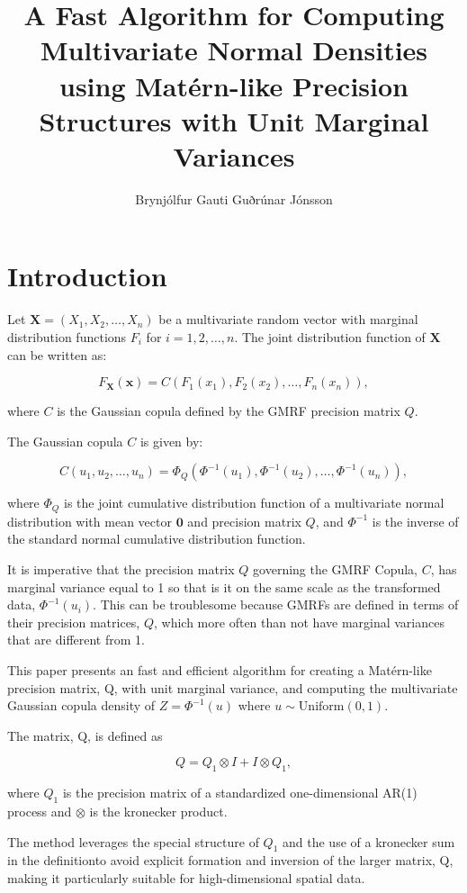 \documentclass[journal=,manuscript=]{achemso}
\author{Brynjólfur Gauti Guðrúnar Jónsson}
\affiliation{ University of Iceland,  }
\title[]{A Fast Algorithm for Computing Multivariate Normal Densities
using Matérn-like Precision Structures with Unit Marginal Variances}
\begin{document}
\maketitle


\section{Introduction}\label{introduction}

Let \(\mathbf{X} = (X_1, X_2, \ldots, X_n)\) be a multivariate random
vector with marginal distribution functions \(F_i\) for
\(i = 1, 2, \ldots, n\). The joint distribution function of
\(\mathbf{X}\) can be written as:

\[
F_{\mathbf{X}}(\mathbf{x}) = C(F_1(x_1), F_2(x_2), \ldots, F_n(x_n)),
\]

where \(C\) is the Gaussian copula defined by the GMRF precision matrix
\(Q\).

The Gaussian copula \(C\) is given by:

\[
C(u_1, u_2, \ldots, u_n) = \Phi_Q(\Phi^{-1}(u_1), \Phi^{-1}(u_2), \ldots, \Phi^{-1}(u_n)),
\]

where \(\Phi_Q\) is the joint cumulative distribution function of a
multivariate normal distribution with mean vector \(\mathbf{0}\) and
precision matrix \(Q\), and \(\Phi^{-1}\) is the inverse of the standard
normal cumulative distribution function.

It is imperative that the precision matrix \(Q\) governing the GMRF
Copula, \(C\), has marginal variance equal to 1 so that is it on the
same scale as the transformed data, \(\Phi^{-1}(u_i)\). This can be
troublesome because GMRFs are defined in terms of their precision
matrices, \(Q\), which more often than not have marginal variances that
are different from 1.

This paper presents an fast and efficient algorithm for creating a
Matérn-like precision matrix, Q, with unit marginal variance, and
computing the multivariate Gaussian copula density of
\(Z = \Phi^{-1}(u)\) where \(u \sim \mathrm{Uniform}(0, 1)\).

The matrix, Q, is defined as

\[
Q = Q_1 \otimes I + I \otimes Q_1,
\]

where \(Q_1\) is the precision matrix of a standardized one-dimensional
AR(1) process and \(\otimes\) is the kronecker product.

The method leverages the special structure of \(Q_1\) and the use of a
kronecker sum in the definitionto avoid explicit formation and inversion
of the larger matrix, Q, making it particularly suitable for
high-dimensional spatial data.
\end{document}
